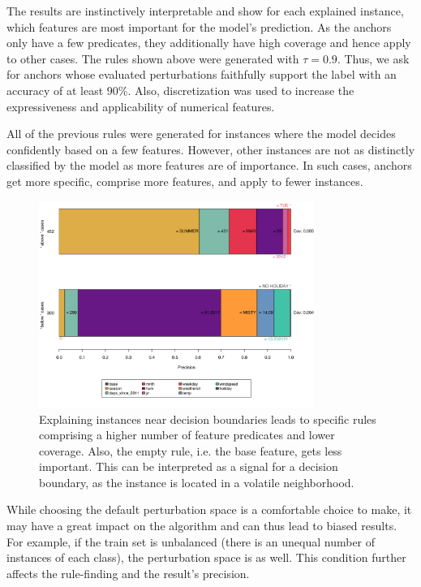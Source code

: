 \documentclass[
  10pt,
]{scrbook}
\begin{document}
The results are instinctively interpretable and show for each explained instance, which features are most important for the model's prediction. As the anchors only have a few predicates, they additionally have high coverage and hence apply to other cases.
The rules shown above were generated with \(\tau = 0.9\). Thus, we ask for anchors whose evaluated perturbations faithfully support the label with an accuracy of at least \(90\%\). Also, discretization was used to increase the expressiveness and applicability of numerical features.

All of the previous rules were generated for instances where the model decides confidently based on a few features. However, other instances are not as distinctly classified by the model as more features are of importance. In such cases, anchors get more specific, comprise more features, and apply to fewer instances.

\begin{figure}

{\centering \includegraphics[width=0.8\textwidth]{images/unnamed-chunk-34-1} 

}

\caption{Explaining instances near decision boundaries leads to specific rules comprising a higher number of feature predicates and lower coverage. Also, the empty rule, i.e. the base feature, gets less important. This can be interpreted as a signal for a decision boundary, as the instance is located in a volatile neighborhood.}\label{fig:unnamed-chunk-34}
\end{figure}

While choosing the default perturbation space is a comfortable choice to make, it may have a great impact on the algorithm and can thus lead to biased results. For example, if the train set is unbalanced (there is an unequal number of instances of each class), the perturbation space is as well. This condition further affects the rule-finding and the result's precision.
\end{document}
